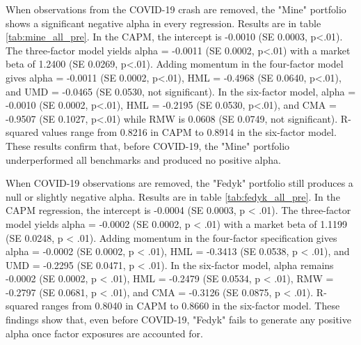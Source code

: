 When observations from the COVID-19 crash are removed, the "Mine" portfolio shows a significant negative alpha in every regression.  
Results are in table \ref{tab:mine_all_pre}.
In the CAPM, the intercept is -0.0010 (SE 0.0003, p<.01).  
The three-factor model yields alpha = -0.0011 (SE 0.0002, p<.01) with a market beta of 1.2400 (SE 0.0269, p<.01).  
Adding momentum in the four-factor model gives alpha = -0.0011 (SE 0.0002, p<.01), HML = -0.4968 (SE 0.0640, p<.01), and UMD = -0.0465 (SE 0.0530, not significant).  
In the six-factor model, alpha = -0.0010 (SE 0.0002, p<.01), HML = -0.2195 (SE 0.0530, p<.01), and CMA = -0.9507 (SE 0.1027, p<.01) while RMW is 0.0608 (SE 0.0749, not significant).  
R-squared values range from 0.8216 in CAPM to 0.8914 in the six-factor model.  
These results confirm that, before COVID-19, the "Mine" portfolio underperformed all benchmarks and produced no positive alpha.


When COVID-19 observations are removed, the "Fedyk" portfolio still produces a null or slightly negative alpha.  
Results are in table \ref{tab:fedyk_all_pre}.
In the CAPM regression, the intercept is -0.0004 (SE 0.0003, p < .01).  
The three-factor model yields alpha = -0.0002 (SE 0.0002, p < .01) with a market beta of 1.1199 (SE 0.0248, p < .01).  
Adding momentum in the four-factor specification gives alpha = -0.0002 (SE 0.0002, p < .01), HML = -0.3413 (SE 0.0538, p < .01), and UMD = -0.2295 (SE 0.0471, p < .01).  
In the six-factor model, alpha remains -0.0002 (SE 0.0002, p < .01), HML = -0.2479 (SE 0.0534, p < .01), RMW = -0.2797 (SE 0.0681, p < .01), and CMA = -0.3126 (SE 0.0875, p < .01).  
R-squared ranges from 0.8040 in CAPM to 0.8660 in the six-factor model.  
These findings show that, even before COVID-19, "Fedyk" fails to generate any positive alpha once factor exposures are accounted for.  

